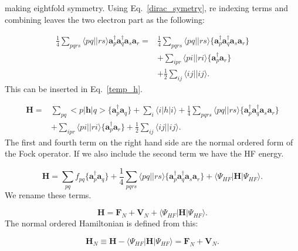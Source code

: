 \documentclass[graybox,sectrefs,envcountresetchap,open=right]{svmonodo}
\begin{document}
making eightfold symmetry. Using Eq.~\ref{dirac_symetry}, re indexing terms and combining leaves the two electron part as the following:

\begin{align}
\frac{1}{4} \sum_{pqrs} \langle pq||rs \rangle \mathbf{a}^{\dagger}_p \mathbf{a}^{\dagger}_q \mathbf{a}_s \mathbf{a}_r = & \frac{1}{4}
\sum_{pqrs} \langle pq||rs \rangle \{\mathbf{a}^{\dagger}_p \mathbf{a}^{\dagger}_q \mathbf{a}_s \mathbf{a}_r\}
 \\ &
+ \sum_{ipr} \langle pi||ri \rangle \{\mathbf{a}^{\dagger}_p \mathbf{a}_r \} \nonumber \\ &
+ \frac{1}{2} \sum_{ij} \langle ij||ij \rangle . \nonumber
\end{align} 
This can be inserted in Eq.~\ref{temp_h}.

\begin{align}
\mathbf{H} = & \sum_{pq} <p|\mathbf{h}|q> 
\{\mathbf{a}^{\dagger}_p \mathbf{a}_q \}
+ \sum_i \langle i|h|i \rangle
 + \frac{1}{4}
\sum_{pqrs} \langle pq||rs \rangle \{\mathbf{a}^{\dagger}_p \mathbf{a}^{\dagger}_q \mathbf{a}_s \mathbf{a}_r\}
 \\ &
+ \sum_{ipr} \langle pi||ri \rangle \{\mathbf{a}^{\dagger}_p \mathbf{a}_r \}
+ \frac{1}{2} \sum_{ij} \langle ij||ij \rangle . \nonumber
\end{align} 
The first and fourth term on the right hand side are the normal ordered form of the Fock operator. If we also include the second term we have the HF energy.

\begin{equation}
\mathbf{H} = \sum_{pq} f_{pq} 
\{\mathbf{a}^{\dagger}_p \mathbf{a}_q \}
 + \frac{1}{4}
\sum_{pqrs} \langle pq||rs \rangle \{\mathbf{a}^{\dagger}_p \mathbf{a}^{\dagger}_q \mathbf{a}_s \mathbf{a}_r\}
+ \langle \Psi_{HF} | \mathbf{H} |\Psi_{HF} \rangle .
\end{equation} 
We rename these terms.

\begin{equation}
\mathbf{H} = \mathbf{F}_N + \mathbf{V}_N + \langle \Psi_{HF} | \mathbf{H} |\Psi_{HF} \rangle .
\end{equation} 
The normal ordered Hamiltonian is defined from this:

\begin{equation}
\mathbf{H}_N \equiv 
\mathbf{H} - \langle \Psi_{HF} | \mathbf{H} |\Psi_{HF} \rangle = 
\mathbf{F}_N + \mathbf{V}_N . \label{normal_order_hamiltonian}
\end{equation} 
\end{document}
